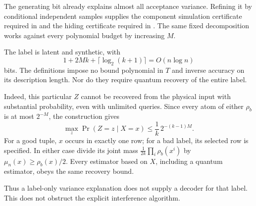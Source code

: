\begin{remark}\label{ian:forrelation-label-meaning}
The generating bit already explains almost all acceptance variance. Refining it by conditional independent samples supplies the component simulation certificate required in  and the hiding certificate required in . The same fixed decomposition works against every polynomial budget by increasing \(M\).

The label is latent and synthetic, with
\[
 1+2Mk+\lceil\log_2(k+1)\rceil=O(n\log n)
\]
bits. The definitions impose no bound polynomial in \(T\) and inverse accuracy on its description length. Nor do they require quantum recovery of the entire label.

Indeed, this particular \(Z\) cannot be recovered from the physical input with substantial probability, even with unlimited queries. Since every atom of either \(\rho_b\) is at most \(2^{-M}\), the construction gives
\[
 \max_z\Pr(Z=z\mid X=x)
 \le\frac1k\,2^{-(k-1)M}.
\]
For a good tuple, \(x\) occurs in exactly one row; for a bad label, its selected row is specified. In either case divide its joint mass
\(\frac1{2k}\prod_i\rho_b(x^i)\) by
\(\mu_n(x)\ge\rho_b(x)/2\).
Every estimator based on \(X\), including a quantum estimator, obeys the same recovery bound.

Thus a label-only variance explanation does not supply a decoder for that label. This does not obstruct the explicit interference algorithm.
\end{remark}

